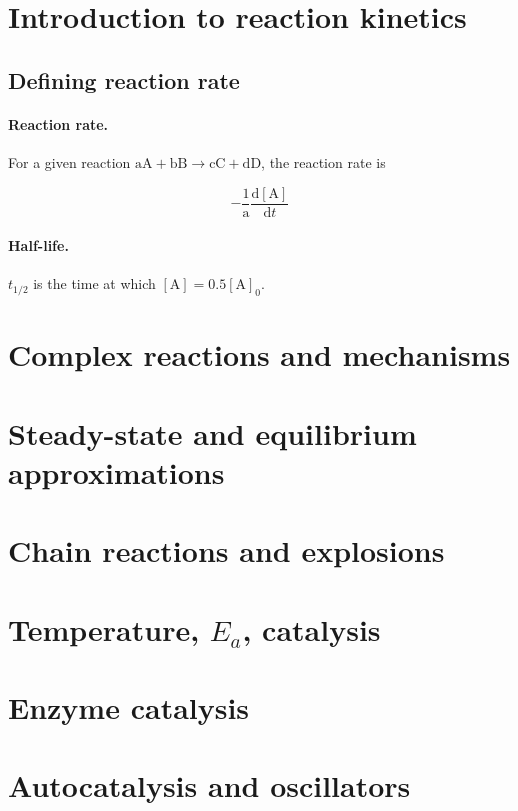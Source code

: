 \documentclass{article}
\numberwithin{theorem}{section}
\numberwithin{corollary}{section}
\numberwithin{postulate}{section}
\numberwithin{lemma}{section}
\numberwithin{definition}{section}
\begin{document}
\section{Introduction to reaction kinetics}

\subsection{Defining reaction rate}

\paragraph{Reaction rate.} For a given reaction $\mathrm{aA} + \mathrm{bB}
\rightarrow \mathrm{cC} + \mathrm{dD}$, the reaction rate is

\begin{equation}
  -\frac{1}{\mathrm{a}} \frac{\mathrm{d[A]}}{\mathrm{d}t} 
\end{equation}

\paragraph{Half-life.} $t_{1/2}$ is the time at which $[\mathrm{A}] =
0.5[\mathrm{A}]_0$.

\section{Complex reactions and mechanisms}

\section{Steady-state and equilibrium approximations}

\section{Chain reactions and explosions}

\section{Temperature, $E_a$, catalysis}

\section{Enzyme catalysis}

\section{Autocatalysis and oscillators}
\end{document}
